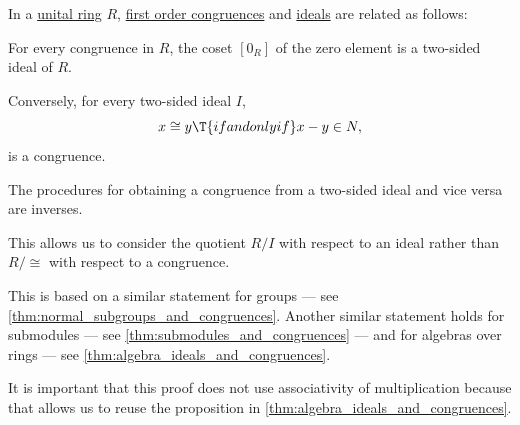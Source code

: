\begin{proposition}\label{thm:ring_ideals_and_congruences}
  In a \hyperref[def:ring]{unital ring} \( R \), \hyperref[def:fol_congruence]{first order congruences} and \hyperref[def:semiring_ideal]{ideals} are related as follows:
  \begin{thmenum}
     For every congruence in \( R \), the coset \( [0_R] \) of the zero element is a two-sided ideal of \( R \).

     Conversely, for every two-sided ideal \( I \),
    \begin{equation}\label{eq:thm:ideal_and_congruences/ideal_to_cong}
      x \cong y \T{if and only if} x - y \in N,
    \end{equation}
    is a congruence.

     The procedures for obtaining a congruence from a two-sided ideal and vice versa are inverses.
  \end{thmenum}
\end{proposition}
\begin{comments}
  \item This allows us to consider the quotient \( R / I \) with respect to an ideal rather than \( R / {\cong} \) with respect to a congruence.

  \item This is based on a similar statement for groups --- see \cref{thm:normal_subgroups_and_congruences}. Another similar statement holds for submodules --- see \cref{thm:submodules_and_congruences} --- and for algebras over rings --- see \cref{thm:algebra_ideals_and_congruences}.

  \item It is important that this proof does not use associativity of multiplication because that allows us to reuse the proposition in \cref{thm:algebra_ideals_and_congruences}.
\end{comments}
